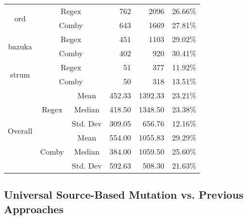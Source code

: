 \documentclass[sigconf,review, anonymous]{acmart}
\begin{document}
{\begin{table}[hbtp]
{\begin{tabular}{|c|c|c|r|r|r|}
\multirow{2}{*}{ord} & \multicolumn{2}{c|}{Regex} & 762 \hspace{8pt}	& 2096 \hspace{8pt} & 26.66\% \\\cline{2-6}
    & \multicolumn{2}{c|}{Comby} & 643 \hspace{8pt} & 1669 \hspace{8pt} & 27.81\% \\ \hline
\multirow{2}{*}{bazuka} & \multicolumn{2}{c|}{Regex} & 451 \hspace{8pt} & 1103 \hspace{8pt} & 29.02\% \\\cline{2-6}
    & \multicolumn{2}{c|}{Comby} & 402 \hspace{8pt} & 920 \hspace{8pt} & 30.41\% \\ \hline
\multirow{2}{*}{strum} & \multicolumn{2}{c|}{Regex} & 51 \hspace{8pt} & 377 \hspace{8pt}	& 11.92\% \\\cline{2-6}
    & \multicolumn{2}{c|}{Comby} & 50 \hspace{8pt} & 318 \hspace{8pt}	& 13.51\% \\ \hline

\multirow{6}{*}{Overall} & \multirow{3}{*}{Regex} & Mean & 452.33 & 1392.33	& 23.21\%\\\cline{3-6}
    &   &  Median & 418.50 & 1348.50 & 23.38\%  \\\cline{3-6}
    &   &  Std. Dev & 309.05 & 656.76 & 12.16\%  \\\cline{2-6}

 & \multirow{3}{*}{Comby} & Mean & 554.00 & 1055.83	& 29.29\% \\\cline{3-6}
    &   &  Median & 384.00 & 1059.50	& 25.60\%  \\\cline{3-6}
    &   &  Std. Dev & 592.63 & 508.30 & 21.63\%  \\\hline


\end{tabular}

}
\end{table}



\subsection{Universal Source-Based Mutation vs. Previous Approaches}


}
\end{document}
